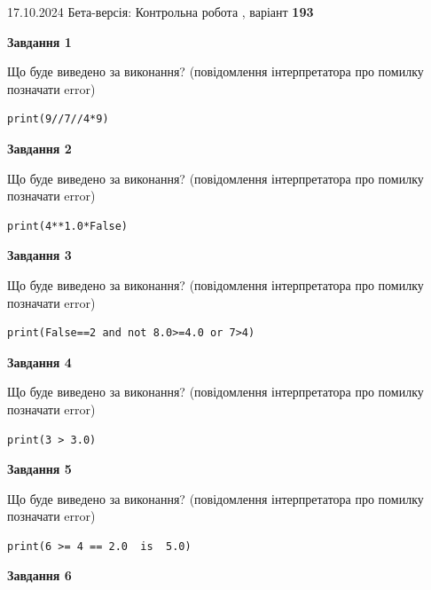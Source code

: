 \documentclass[12pt, ukrainian]{article}
\begin{document}
{\Large{17.10.2024 Бета-версія: Контрольна робота , варіант  \No \textbf { 193 }\par}}
{
\begin {large}
{\begin {center}\textbf{Завдання 1}\end {center}}

Що буде виведено за виконання? (повідомлення інтерпретатора про помилку позначати error)\par
\begin{verbatim}
print(9//7//4*9)
\end{verbatim}

{\begin {center}\textbf{Завдання 2}\end {center}}

Що буде виведено за виконання? (повідомлення інтерпретатора про помилку позначати error)\par
\begin{verbatim}
print(4**1.0*False)
\end{verbatim}

{\begin {center}\textbf{Завдання 3}\end {center}}

Що буде виведено за виконання? (повідомлення інтерпретатора про помилку позначати error)\par
\begin{verbatim}
print(False==2 and not 8.0>=4.0 or 7>4)
\end{verbatim}

{\begin {center}\textbf{Завдання 4}\end {center}}

Що буде виведено за виконання? (повідомлення інтерпретатора про помилку позначати error)\par
\begin{verbatim}
print(3 > 3.0)
\end{verbatim}

{\begin {center}\textbf{Завдання 5}\end {center}}

Що буде виведено за виконання? (повідомлення інтерпретатора про помилку позначати error)\par
\begin{verbatim}
print(6 >= 4 == 2.0  is  5.0)
\end{verbatim}

{\begin {center}\textbf{Завдання 6}\end {center}}


\end{large}}
\end{document}
